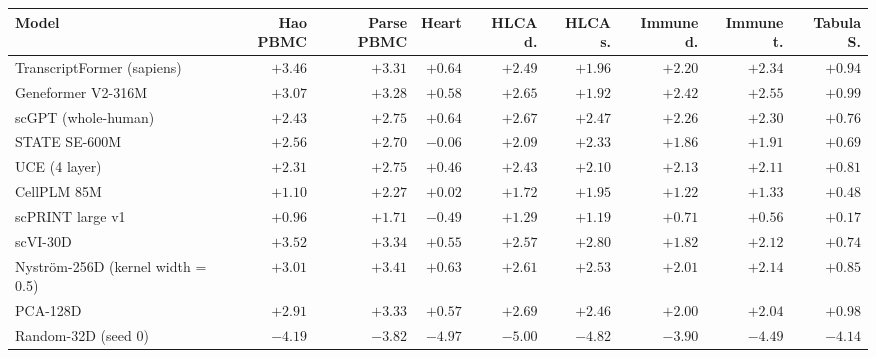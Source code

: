 \begin{tabular}{@{}lrrrrrrrr@{}}
\toprule
Model & Hao PBMC & Parse PBMC & Heart & HLCA d. & HLCA s. & Immune d. & Immune t. & Tabula S. \\
\midrule
TranscriptFormer (sapiens) & $+3.46$ & $+3.31$ & $+0.64$ & $+2.49$ & $+1.96$ & $+2.20$ & $+2.34$ & $+0.94$ \\
Geneformer V2-316M & $+3.07$ & $+3.28$ & $+0.58$ & $+2.65$ & $+1.92$ & $+2.42$ & $+2.55$ & $+0.99$ \\
scGPT (whole-human) & $+2.43$ & $+2.75$ & $+0.64$ & $+2.67$ & $+2.47$ & $+2.26$ & $+2.30$ & $+0.76$ \\
STATE SE-600M & $+2.56$ & $+2.70$ & $-0.06$ & $+2.09$ & $+2.33$ & $+1.86$ & $+1.91$ & $+0.69$ \\
UCE (4 layer) & $+2.31$ & $+2.75$ & $+0.46$ & $+2.43$ & $+2.10$ & $+2.13$ & $+2.11$ & $+0.81$ \\
CellPLM 85M & $+1.10$ & $+2.27$ & $+0.02$ & $+1.72$ & $+1.95$ & $+1.22$ & $+1.33$ & $+0.48$ \\
scPRINT large v1 & $+0.96$ & $+1.71$ & $-0.49$ & $+1.29$ & $+1.19$ & $+0.71$ & $+0.56$ & $+0.17$ \\
\midrule
scVI-30D & $+3.52$ & $+3.34$ & $+0.55$ & $+2.57$ & $+2.80$ & $+1.82$ & $+2.12$ & $+0.74$ \\
Nyström-256D (kernel width = 0.5) & $+3.01$ & $+3.41$ & $+0.63$ & $+2.61$ & $+2.53$ & $+2.01$ & $+2.14$ & $+0.85$ \\
PCA-128D & $+2.91$ & $+3.33$ & $+0.57$ & $+2.69$ & $+2.46$ & $+2.00$ & $+2.04$ & $+0.98$ \\
Random-32D (seed 0) & $-4.19$ & $-3.82$ & $-4.97$ & $-5.00$ & $-4.82$ & $-3.90$ & $-4.49$ & $-4.14$ \\
\bottomrule
\end{tabular}
